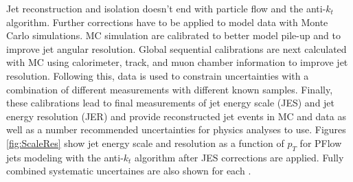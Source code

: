Jet reconstruction and isolation doesn't end with particle flow and the anti-$k_t$ algorithm. Further corrections have to be applied to model data with Monte Carlo simulations. MC simulation are calibrated to better model pile-up and to improve jet angular resolution. Global sequential calibrations are next calculated with MC using calorimeter, track, and muon chamber information to improve jet resolution. Following this, data is used to constrain uncertainties with a combination of different measurements with different known samples. Finally, these calibrations lead to final measurements of jet energy scale (JES) and jet energy resolution (JER) and provide reconstructed jet events in MC and data as well as a number recommended uncertainties for physics analyses to use.  Figures \ref{fig:ScaleRes} show jet energy scale and resolution as a function of $p_T$ for PFlow jets modeling with the anti-$k_t$ algorithm after JES corrections are applied. Fully combined systematic uncertaines are also shown for each \cite{jetscaleres}.

